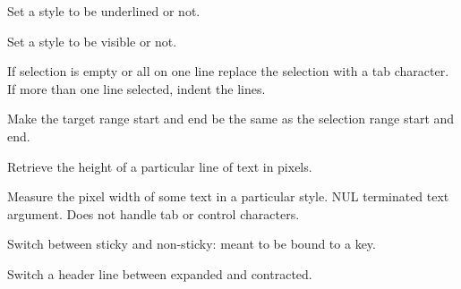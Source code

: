
Set a style to be underlined or not.


\label{wxstyledtextctrlstylesetvisible}


Set a style to be visible or not.


\label{wxstyledtextctrltab}


If selection is empty or all on one line replace the selection with a tab character.
If more than one line selected, indent the lines.


\label{wxstyledtextctrltargetfromselection}


Make the target range start and end be the same as the selection range start and end.


\label{wxstyledtextctrltextheight}


Retrieve the height of a particular line of text in pixels.


\label{wxstyledtextctrltextwidth}


Measure the pixel width of some text in a particular style.
NUL terminated text argument.
Does not handle tab or control characters.


\label{wxstyledtextctrltogglecaretsticky}


Switch between sticky and non-sticky: meant to be bound to a key.


\label{wxstyledtextctrltogglefold}


Switch a header line between expanded and contracted.


\label{wxstyledtextctrlundo}


